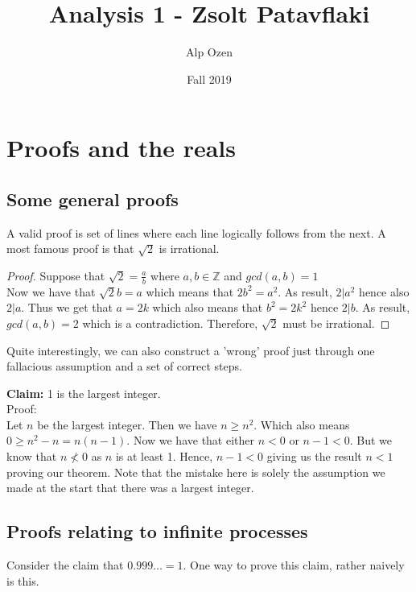\documentclass[titlepage]{article}
\title{\textbf{Analysis 1 - Zsolt Patavflaki}}
\author{Alp Ozen}
\date{Fall 2019}
\numberwithin{equation}{subsection}
\begin{document}
\maketitle
\tableofcontents
\clearpage
\section{Proofs and the reals}
\subsection{Some general proofs}
A valid proof is set of lines where each line logically follows from the next. 
A most famous proof is that $\sqrt{2} $ is irrational. 

\begin{tcolorbox}
\begin{proof}
	Suppose that $\sqrt{2} = \frac{a}{b}$ where $a,b \in \mathbb{Z}$ and $gcd(a,b) = 1$
	\\
	Now we have that $\sqrt{2}b = a$ which means that $2b^2 = a^2$.
	As result, $2 \vert a^2$ hence also $2 \vert a$. Thus we get that $a = 2k$ which also means that $b^2 = 2k^2$ hence $2 \vert b$. As result, $gcd(a,b) = 2$ which is a contradiction. Therefore, $\sqrt{2}$ must be irrational. 
	\end{proof}
\end{tcolorbox}

Quite interestingly, we can also construct a 'wrong' proof just through one fallacious assumption and a set of correct steps. 

\begin{tcolorbox}
    \textbf{Claim:} 1 is the largest integer.
    \\
    Proof: 
    \\
    Let $n$ be the largest integer. Then we have $n \geq n^2$. Which also means $0 \geq n^2 - n = n(n-1)$. Now we have that either $n < 0$ or $n - 1 < 0$. But we know that $ n \nless 0$ as $n$ is at least 1. Hence, $n - 1 < 0$ giving us the result $n < 1$ proving our theorem. Note that the mistake here is solely the assumption we made at the start that there was a largest integer. 
\end{tcolorbox}
\subsection{Proofs relating to infinite processes}
Consider the claim that $0.999\ldots = 1$.
One way to prove this claim, rather naively is this.
\end{document}
